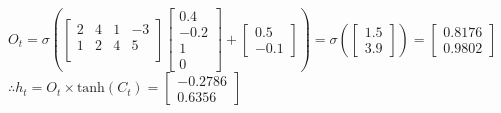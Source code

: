 \documentclass{article}
\begin{document}
\begin{enumerate}
    $
    O_t=\sigma(
    \begin{bmatrix}
    2&4&1&-3\\
    1&2&4&5\\
    \end{bmatrix}
    \begin{bmatrix}
    0.4\\-0.2\\1\\0
    \end{bmatrix}
    +
    \begin{bmatrix}
    0.5\\-0.1
    \end{bmatrix})
    =\sigma(
    \begin{bmatrix}
    1.5\\3.9
    \end{bmatrix}
    )=
	\begin{bmatrix}
	0.8176\\0.9802
	\end{bmatrix}    
    $\\
    $\therefore 
    h_t=O_t \times \text{tanh}(C_t)=
    \begin{bmatrix}
    -0.2786\\0.6356
    \end{bmatrix}
    $\\\\
    

\end{enumerate}
\end{document}
